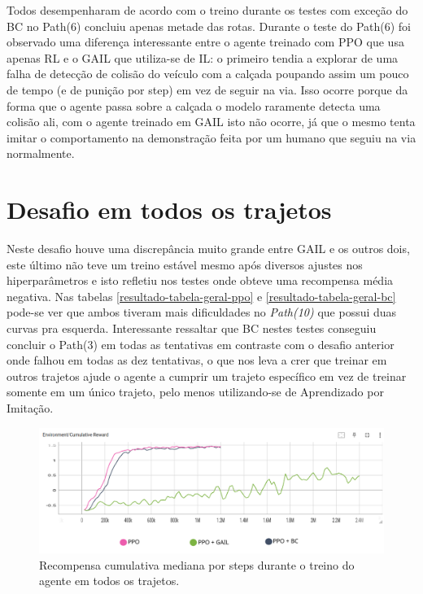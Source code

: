 Todos desempenharam de acordo com o treino durante os testes com exceção do BC no Path(6) concluiu apenas metade das rotas. Durante o teste do Path(6) foi observado uma diferença interessante entre o agente treinado com PPO que usa apenas RL e o GAIL que utiliza-se de IL: o primeiro tendia a explorar de uma falha de detecção de colisão do veículo com a calçada poupando assim um pouco de tempo (e de punição por step) em vez de seguir na via. Isso ocorre porque da forma que o agente passa sobre a calçada o modelo raramente detecta uma colisão ali, com o agente treinado em GAIL isto não ocorre, já que o mesmo tenta imitar o comportamento na demonstração feita por um humano que seguiu na via normalmente.

\section{Desafio em todos os trajetos}
Neste desafio houve uma discrepância muito grande entre GAIL e os outros dois, este último não teve um treino estável mesmo após diversos ajustes nos hiperparâmetros e isto refletiu nos testes onde obteve uma recompensa média negativa. Nas tabelas \ref{resultado-tabela-geral-ppo} e \ref{resultado-tabela-geral-bc} pode-se ver que ambos tiveram mais dificuldades no \textit{Path(10)} que possui duas curvas pra esquerda. Interessante ressaltar que BC nestes testes conseguiu concluir o Path(3) em todas as tentativas em contraste com o desafio anterior onde falhou em todas as dez tentativas, o que nos leva a crer que treinar em outros trajetos ajude o agente a cumprir um trajeto específico em vez de treinar somente em um único trajeto, pelo menos utilizando-se de Aprendizado por Imitação.

\begin{figure}[h]
    \centering
    \includegraphics[scale=0.35]{figs/treinos/desafio-geral/recompensa-ppo-gail-bc.png}
    \caption{Recompensa cumulativa mediana por steps durante o treino do agente em todos os trajetos.}
\end{figure}

